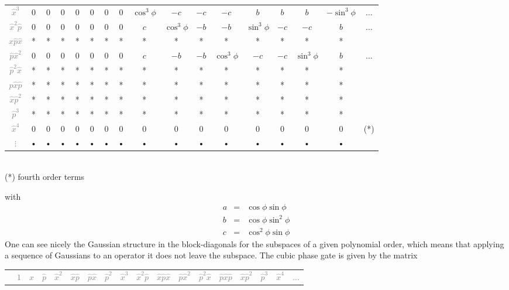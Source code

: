 \documentclass[aps,pra,10pt,onecolumn,notitlepage, groupedaddress,nofootinbib]{revtex4-1}
\theoremstyle{plain}
\begin{document}
{\begin{center}
\begin{tabular}{ccccccccccccccccc}
\textcolor{gray}{$\hat{x}^3$} & 0 & 0 & 0 & 0 & 0 & 0 & 0 & $\cos^3 \phi$ & $- c$ & $- c$ & $ -c$ & $ b$ & $b$ & $b$ & $-\sin^3 \phi$ &  $\hdots$ \\ 
\textcolor{gray}{$\hat{x}^2\hat{p}$} & 0 & 0 & 0 & 0 & 0 & 0 & 0 & $c$ & $\cos^3 \phi$ & $-b$ & $-b$ & $\sin^3 \phi$ & $-c$  & $-c$ & $b$ &  $\hdots$ \\ 
\textcolor{gray}{$\hat{x}\hat{p}\hat{x}$} & * & * & * & * & * & * & * & * & * & * & * & * & *  & *& *  \\ 
\textcolor{gray}{$\hat{p}\hat{x}^2$} & 0 & 0 & 0 & 0 & 0 & 0 & 0 & $c$ & $-b$ & $-b$ & $\cos^3 \phi$ & $-c$ & $-c$  & $\sin^3 \phi$ & $b$ &  $\hdots$ \\ 
\textcolor{gray}{$\hat{p}^2\hat{x}$} & * & * & * & * & * & * & * & * & * & * & * & * & *  & *& *  \\ 
\textcolor{gray}{$\hat{p}\hat{x}\hat{p}$} & * & * & * & * & * & * & * & * & * & * & * & * & *  & * & * \\ 
\textcolor{gray}{$\hat{x}\hat{p}^2$} & * & * & * & * & * & * & * & * & * & * & * & * & *  & *& *  \\ 
\textcolor{gray}{$\hat{p}^3$} & * & * & * & * & * & * & * & * & * & * & * & * & *  & *& *  \\ 
\textcolor{gray}{$\hat{x}^4$} & 0 & 0 & 0 & 0 & 0 & 0 & 0 & 0 & 0 & 0 & 0 & 0 & 0& 0 & 0 & (*) \\ 
\textcolor{gray}{$\vdots$} & • & • & • & • & • & • & • & • & • & • & • & • & • & •& •  \\ 
\end{tabular}   \\
(*) fourth order terms
\end{center}
with
\begin{eqnarray*}
a &=& \cos \phi \sin \phi \\
b &=& \cos \phi \sin^2 \phi \\
c &=& \cos^2 \phi \sin \phi 
\end{eqnarray*}
One can see nicely the Gaussian structure in the block-diagonals for the subspaces of a given polynomial order, which means that applying a sequence of Gaussians to an operator it does not leave the subspace. 
The cubic phase gate is given by the matrix
\begin{center}
\def\arraystretch{1.5}
\footnotesize
\begin{tabular}{cccccccccccccccccc}
& \textcolor{gray}{$1$} & \textcolor{gray}{$\hat{x}$} & \textcolor{gray}{$\hat{p}$} & \textcolor{gray}{$\hat{x}^2$} & \textcolor{gray}{$\hat{x}\hat{p}$} & \textcolor{gray}{$\hat{p}\hat{x}$} & \textcolor{gray}{$\hat{p}^2$} & \textcolor{gray}{$\hat{x}^3$} & \textcolor{gray}{$\hat{x}^2\hat{p}$} & \textcolor{gray}{$\hat{x}\hat{p}\hat{x}$} & \textcolor{gray}{$\hat{p}\hat{x}^2$} &  \textcolor{gray}{$\hat{p}^2\hat{x}$} &  \textcolor{gray}{$\hat{p}\hat{x}\hat{p}$} &  \textcolor{gray}{$\hat{x}\hat{p}^2$} &  \textcolor{gray}{$\hat{p}^3$} & \textcolor{gray}{$\hat{x}^4$} & \textcolor{gray}{$\hdots$} \\  

\end{tabular}
\end{center}}
\end{document}
